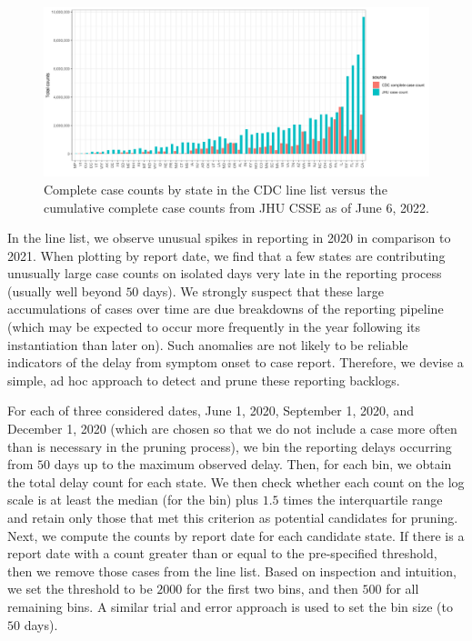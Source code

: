 \documentclass{article}
\begin{document}
\begin{figure}[!tb]
\centering
    \includegraphics[width=1.20\textwidth]{prop_cc_cdc_vs_jhu.pdf} %
    \caption{Complete case counts by state in the CDC line list versus the cumulative complete case counts from JHU CSSE as of June 6, 2022. 
}
    \label{fig:prop_cc_cdc_vs_jhu}
\end{figure}

In the line list, we observe unusual spikes in reporting in 2020 in comparison to 2021. When plotting by report date, we find that a few states are contributing unusually large case counts on isolated days very late in the reporting process (usually well beyond $50$ days). We strongly suspect that these large accumulations of cases over time are due breakdowns of the reporting pipeline (which may be expected to occur more frequently in the year following its instantiation than later on). Such anomalies are not likely to be reliable indicators of the delay from symptom onset to case report. Therefore, we devise a simple, ad hoc approach to detect and prune these reporting backlogs. 

For each of three considered dates, June 1, 2020, September 1, 2020, and December 1, 2020 (which are chosen so that we do not include a case more often than is necessary in the pruning process), we bin the reporting delays occurring from $50$ days up to the maximum observed delay. Then, for each bin, we obtain the total delay count for each state. We then check whether each count on the log scale is at least the median (for the bin) plus $1.5$ times the interquartile range and retain only those that met this criterion as potential candidates for pruning. Next, we compute the counts by report date for each candidate state. If there is a report date with a count greater than or equal to the pre-specified threshold, then we remove those cases from the line list. Based on inspection and intuition, we set the threshold to be $2000$ for the first two bins, and then $500$ for all remaining bins. A similar trial and error approach is used to set the bin size (to $50$ days). %
\end{document}
